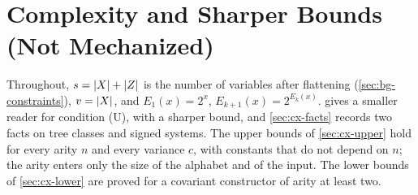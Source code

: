 
\providecommand{\parity}{\operatorname{par}}
\providecommand{\CondI}{\textup{(I0)}}
\providecommand{\CondU}{\textup{(U)}}
\providecommand{\CondII}{\textup{(II)}}
\providecommand{\GuardS}{\Guard_{\mathrm{s}}}
\providecommand{\Lnm}{\mathsf L_{\mathrm{nm}}}
\providecommand{\RU}{\mathcal R_{\mathrm U}}
\providecommand{\PosOp}{\operatorname{Pos}}
\providecommand{\cxcode}{\operatorname{code}}   %
\providecommand{\cxemb}{E}                      %

\section{Complexity and Sharper Bounds (Not Mechanized)}\label{sec:cx}

\noindent{}

\medskip
Throughout, $s=\lvert X\rvert+\lvert Z\rvert$ is the number of variables after flattening
(\cref{sec:bg-constraints}), $v=\lvert X\rvert$, and $E_1(x)=2^x$,
$E_{k+1}(x)=2^{E_k(x)}$.  gives a smaller reader for
condition \CondU, with a sharper bound, and \cref{sec:cx-facts} records two
facts on tree classes and signed systems. The upper bounds of
\cref{sec:cx-upper} hold for every arity $n$ and every variance $c$, with
constants that do not depend on $n$; the arity enters only the size of the
alphabet and of the input. The lower bounds of \cref{sec:cx-lower} are proved
for a covariant constructor of arity at least two.

